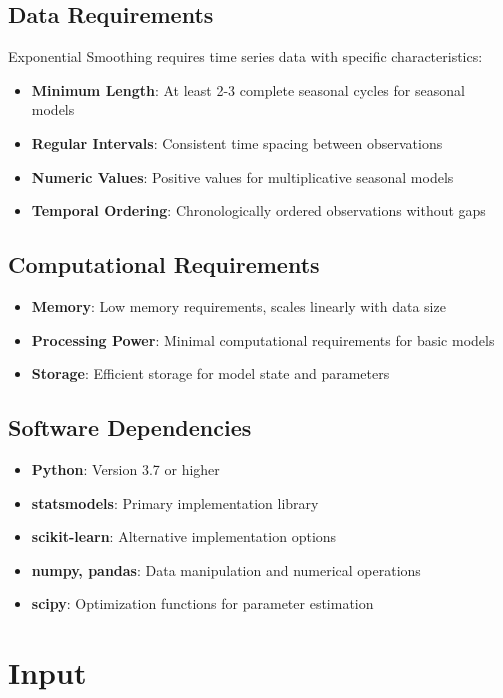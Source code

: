 \subsection{Data Requirements}
Exponential Smoothing requires time series data with specific characteristics:

\begin{itemize}
    \item \textbf{Minimum Length}: At least 2-3 complete seasonal cycles for seasonal models
    \item \textbf{Regular Intervals}: Consistent time spacing between observations
    \item \textbf{Numeric Values}: Positive values for multiplicative seasonal models
    \item \textbf{Temporal Ordering}: Chronologically ordered observations without gaps
\end{itemize}

\subsection{Computational Requirements}
\begin{itemize}
    \item \textbf{Memory}: Low memory requirements, scales linearly with data size
    \item \textbf{Processing Power}: Minimal computational requirements for basic models
    \item \textbf{Storage}: Efficient storage for model state and parameters
\end{itemize}

\subsection{Software Dependencies}
\begin{itemize}
    \item \textbf{Python}: Version 3.7 or higher
    \item \textbf{statsmodels}: Primary implementation library
    \item \textbf{scikit-learn}: Alternative implementation options
    \item \textbf{numpy, pandas}: Data manipulation and numerical operations
    \item \textbf{scipy}: Optimization functions for parameter estimation
\end{itemize}

\section{Input}
\label{sec:input}

